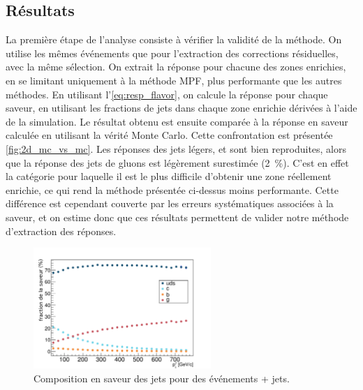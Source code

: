 \subsection{Résultats}

La première étape de l'analyse consiste à vérifier la validité de la méthode. On utilise les mêmes événements que pour l'extraction des corrections résiduelles, avec la même sélection. On extrait la réponse pour chacune des zones enrichies, en se limitant uniquement à la méthode MPF, plus performante que les autres méthodes. En utilisant l'\cref{eq:resp_flavor}, on calcule la réponse pour chaque saveur, en utilisant les fractions de jets dans chaque zone enrichie dérivées à l'aide de la simulation. Le résultat obtenu est ensuite comparée à la réponse en saveur calculée en utilisant la vérité Monte Carlo. Cette confrontation est présentée \cref{fig:2d_mc_vs_mc}. Les réponses des jets légers, \Pcharm et \Pbottom sont bien reproduites, alors que la réponse des jets de gluons est légèrement surestimée (\tilde \SI{2}{\%}). C'est en effet la catégorie pour laquelle il est le plus difficile d'obtenir une zone réellement enrichie, ce qui rend la méthode présentée ci-dessus moins performante. Cette différence est cependant couverte par les erreurs systématiques associées à la saveur, et on estime donc que ces résultats permettent de valider notre méthode d'extraction des réponses.

\begin{figure}[tbp]
  \centering
  \includegraphics[width=0.60\textwidth]{chapitre4/figs/flavor/gammajet_flavors.pdf}
  \caption{Composition en saveur des jets pour des événements \Pphoton + jets.}
  \label{fig:gjet_flavor}
\end{figure}

